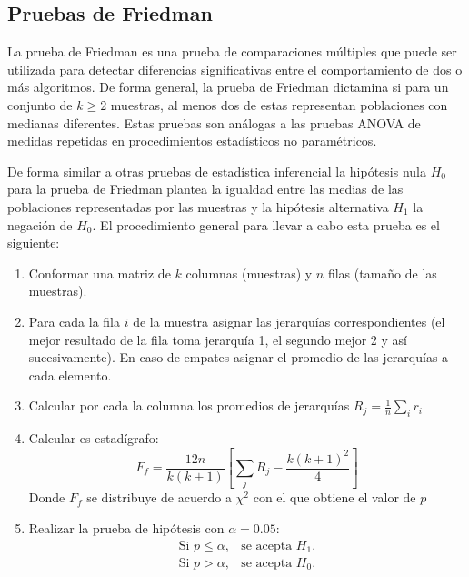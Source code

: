 \subsection{Pruebas de Friedman}
La prueba de Friedman es una prueba de comparaciones múltiples que puede ser utilizada para detectar diferencias significativas entre el comportamiento de dos o más algoritmos. De forma general, la prueba de Friedman dictamina si para un conjunto de $k \geq 2$ muestras, al menos dos de estas representan poblaciones con medianas diferentes. Estas pruebas son análogas a las pruebas ANOVA de medidas repetidas en procedimientos estadísticos no paramétricos. 

De forma similar a otras pruebas de estadística inferencial la hipótesis nula $H_0$ para la prueba de Friedman plantea la igualdad entre las medias de las poblaciones representadas por las muestras y la hipótesis alternativa $H_1$ la negación de $H_0$. El procedimiento general para llevar a cabo esta prueba es el siguiente:
\begin{enumerate}
	\item Conformar una matriz de $k$ columnas (muestras) y $n$ filas (tamaño de las muestras).
	\item Para cada la fila $i$ de la muestra asignar las jerarquías correspondientes (el mejor resultado de la fila toma jerarquía 1, el segundo mejor 2 y así sucesivamente). En caso de empates asignar el promedio de las jerarquías a cada elemento.
	\item Calcular por cada la columna los promedios de jerarquías  $R_j=\frac{1}{n}\sum_i{r_i}$ 
	\item Calcular es estadígrafo:
	\begin{equation}
	F_f=\frac{12n}{k(k+1)}\left [  \sum_j{R_j}-\frac{k(k+1)^2}{4}\right]
	\end{equation}
	Donde $F_f$ se distribuye de acuerdo a $\chi^2$ con el que obtiene el valor de $p$
	\item Realizar la prueba de hipótesis con $\alpha=0.05$:
	\begin{eqnarray}
	\text{Si } p \leq \alpha,& \text{se acepta } H_1.\\
	\text{Si } p> \alpha,& \text{se acepta } H_0.
	\end{eqnarray}
	
\end{enumerate}

